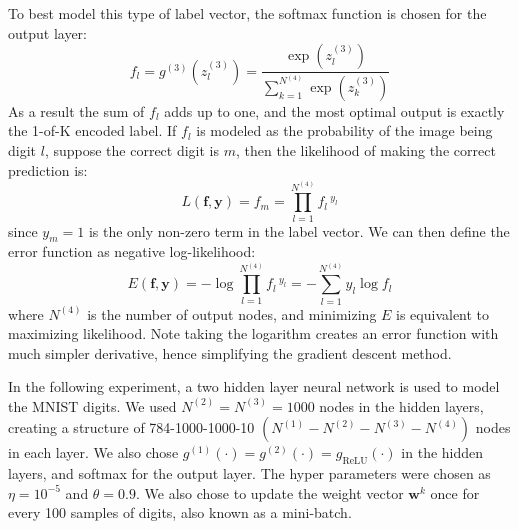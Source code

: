 \documentclass[12pt]{article}
\newcommand{\mb}{\mathbf}
\begin{document}
To best model this type of label vector,
the softmax function is chosen for the output layer:
%
\begin{equation}
	f_l = 
	g^{(3)}(z_l^{(3)}) = \frac{\exp(z_l^{(3)})}
		{\sum_{k=1}^{N^{(4)}} \exp(z_k^{(3)})}
\end{equation}
%
\indent As a result the sum of $f_l$ adds up to one,
and the most optimal output is exactly the 1-of-K encoded label.
If $f_l$ is modeled as the probability of the image being digit $l$,
suppose the correct digit is $m$,
then the likelihood of making the correct prediction is:
%
\begin{equation}
  L(\mb{f},\mb{y}) = f_m = \prod_{l=1}^{N^{(4)}} f_l \, ^{y_l}
\end{equation}
%
since $y_m = 1$ is the only non-zero term in the label vector.
We can then define the error function as negative log-likelihood:
%
\begin{equation}
	E(\mb{f},\mb{y}) 
		= - \log \prod_{l=1}^{N^{(4)}} f_l \, ^{y_l}
		= - \sum_{l=1}^{N^{(4)}} y_l \log f_l
\end{equation}
%
where $N^{(4)}$ is the number of output nodes, 
and minimizing $E$ is equivalent to maximizing likelihood.
Note taking the logarithm creates an error function with much
simpler derivative, 
hence simplifying the gradient descent method.

In the following experiment, 
a two hidden layer neural network is used to model the MNIST digits.
We used $N^{(2)} = N^{(3)} = 1000$ nodes in the hidden layers, 
creating a structure of 784-1000-1000-10 
$\left( N^{(1)} - N^{(2)} - N^{(3)} - N^{(4)} \right)$
nodes in each layer.
We also chose 
$g^{(1)}(\cdot) = g^{(2)}(\cdot) = g_\text{ReLU}(\cdot)$ 
in the hidden layers,
and softmax for the output layer.
The hyper parameters were chosen as $\eta = 10^{-5}$
and $\theta = 0.9$.
We also chose to update the weight vector $\mb{w}^k$ once
for every 100 samples of digits,
also known as a mini-batch.
\end{document}
